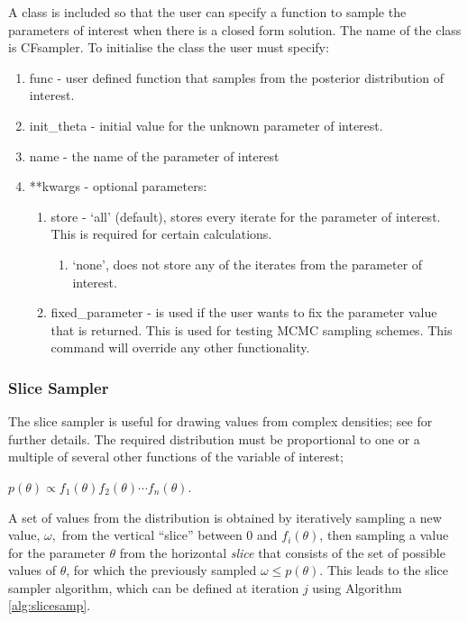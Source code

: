 \documentclass[article]{jss}
\begin{document}
A class is included so that the user can specify a function to sample
the parameters of interest when there is a closed form solution. The
name of the class is CFsampler. To initialise the class the user must
specify:
\begin{enumerate}
\item func - user defined function that samples from the posterior
  distribution of interest.
\item init\_theta - initial value for the unknown parameter of
  interest.
\item name - the name of the parameter of interest
\item {*}{*}kwargs - optional parameters:

\begin{enumerate}
\item store - `all' (default), stores every iterate for the parameter of
interest. This is required for certain calculations.

\begin{enumerate}
\item `none', does not store any of the iterates from the parameter of interest. 
\end{enumerate}
\item fixed\_parameter - is used if the user wants to fix the
  parameter value that is returned. This is used for testing MCMC
  sampling schemes.  This command will override any other
  functionality.
\end{enumerate}
\end{enumerate}

\subsubsection{Slice Sampler}

The slice sampler is useful for drawing values from complex densities;
see \citet{Radford2003} for further details. The required distribution
must be proportional to one or a multiple of several other functions
of the variable of interest;

$p(\theta)\propto f_{1}(\theta)f_{2}(\theta)\cdots f_{n}(\theta).$

A set of values from the distribution is obtained by iteratively sampling
a new value, $\omega,$ from the vertical {}``slice'' between 0
and $f_{i}(\theta)$, then sampling a value for the parameter $\theta$
from the horizontal \emph{slice} that consists of the set of possible
values of $\theta$, for which the previously sampled $\omega\le p(\theta)$.
This leads to the slice sampler algorithm, which can be defined at
iteration $j$ using Algorithm \ref{alg:slicesamp}.
\end{document}
